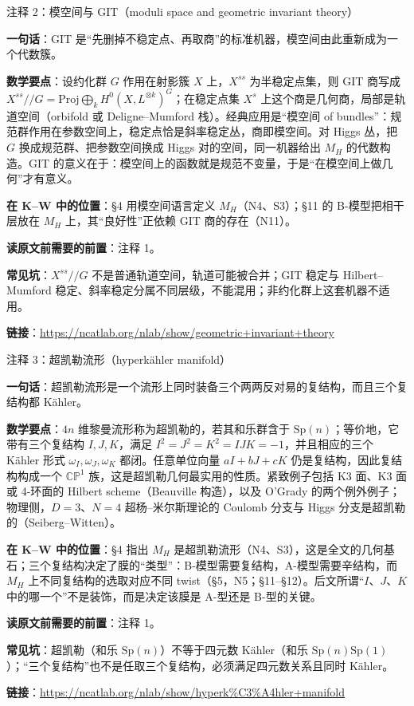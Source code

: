 \begin{kcard}{注释 2：模空间与 GIT（moduli space and geometric invariant theory）}

\textbf{一句话}：GIT 是“先删掉不稳定点、再取商”的标准机器，模空间由此重新成为一个代数簇。

\textbf{数学要点}：设约化群 $G$ 作用在射影簇 $X$ 上，$X^{ss}$ 为半稳定点集，则 GIT 商写成 $X^{ss}/\!/G=\mathrm{Proj}\bigoplus_k H^0(X,L^{\otimes k})^G$；在稳定点集 $X^{s}$ 上这个商是几何商，局部是轨道空间（orbifold 或 Deligne--Mumford 栈）。经典应用是“模空间 of bundles”：规范群作用在参数空间上，稳定点恰是斜率稳定丛，商即模空间。对 Higgs 丛，把 $G$ 换成规范群、把参数空间换成 Higgs 对的空间，同一机器给出 $M_H$ 的代数构造。GIT 的意义在于：模空间上的函数就是规范不变量，于是“在模空间上做几何”才有意义。

\textbf{在 K--W 中的位置}：§4 用模空间语言定义 $M_H$（N4、S3）；§11 的 B-模型把相干层放在 $M_H$ 上，其“良好性”正依赖 GIT 商的存在（N11）。

\textbf{读原文前需要的前置}：注释 1。

\textbf{常见坑}：$X^{ss}/\!/G$ 不是普通轨道空间，轨道可能被合并；GIT 稳定与 Hilbert--Mumford 稳定、斜率稳定分属不同层级，不能混用；非约化群上这套机器不适用。

\noindent\textbf{链接}：\url{https://ncatlab.org/nlab/show/geometric+invariant+theory}
\end{kcard}

\begin{kcard}{注释 3：超凯勒流形（hyperkähler manifold）}

\textbf{一句话}：超凯勒流形是一个流形上同时装备三个两两反对易的复结构，而且三个复结构都 Kähler。

\textbf{数学要点}：$4n$ 维黎曼流形称为超凯勒的，若其和乐群含于 $\mathrm{Sp}(n)$；等价地，它带有三个复结构 $I,J,K$，满足 $I^2=J^2=K^2=IJK=-1$，并且相应的三个 Kähler 形式 $\omega_I,\omega_J,\omega_K$ 都闭。任意单位向量 $aI+bJ+cK$ 仍是复结构，因此复结构构成一个 $\mathbb{CP}^1$ 族，这是超凯勒几何最实用的性质。紧致例子包括 K3 面、K3 面或 4-环面的 Hilbert scheme（Beauville 构造），以及 O'Grady 的两个例外例子；物理侧，$D=3$、$N=4$ 超杨--米尔斯理论的 Coulomb 分支与 Higgs 分支是超凯勒的（Seiberg--Witten）。

\textbf{在 K--W 中的位置}：§4 指出 $M_H$ 是超凯勒流形（N4、S3），这是全文的几何基石；三个复结构决定了膜的“类型”：B-模型需要复结构，A-模型需要辛结构，而 $M_H$ 上不同复结构的选取对应不同 twist（§5，N5；§11--§12）。后文所谓“$I$、$J$、$K$ 中的哪一个”不是装饰，而是决定该膜是 A-型还是 B-型的关键。

\textbf{读原文前需要的前置}：注释 1。

\textbf{常见坑}：超凯勒（和乐 $\mathrm{Sp}(n)$）不等于四元数 Kähler（和乐 $\mathrm{Sp}(n)\mathrm{Sp}(1)$）；“三个复结构”也不是任取三个复结构，必须满足四元数关系且同时 Kähler。

\noindent\textbf{链接}：\url{https://ncatlab.org/nlab/show/hyperk%C3%A4hler+manifold}
\end{kcard}

